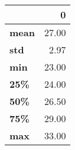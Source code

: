 \begin{tabular}{lr}
\toprule
{} &      0 \\
\midrule
\textbf{mean} &  27.00 \\
\textbf{std } &   2.97 \\
\textbf{min } &  23.00 \\
\textbf{25\% } &  24.00 \\
\textbf{50\% } &  26.50 \\
\textbf{75\% } &  29.00 \\
\textbf{max } &  33.00 \\
\bottomrule
\end{tabular}

